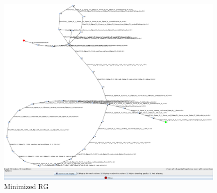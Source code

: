 \documentclass{llncs}
\begin{document}
\begin{itemize}
\begin{figure}[!htbp]
	\centering
	\includegraphics[width=0.99\textwidth]{figures/RGMinimized.png}
	\caption{Minimized RG}
	\label{fig:RGMinimized}
\end{figure}

\end{itemize}

%
%
\end{document}
